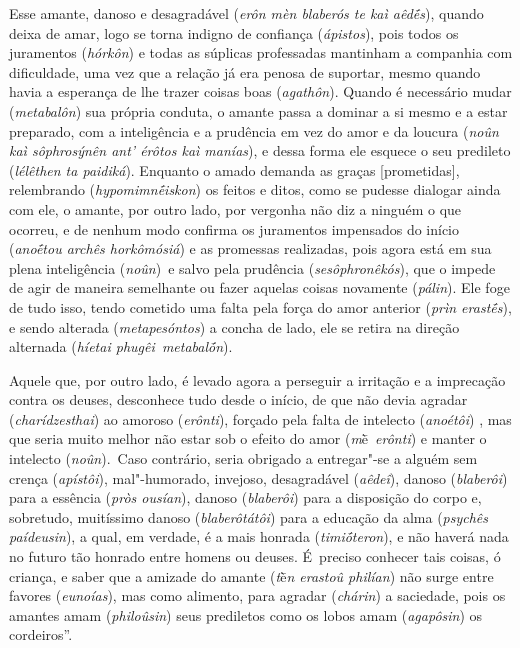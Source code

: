 Esse amante, danoso e desagradável (\emph{erôn mèn blaberós te kaì
aêdḗs}), quando deixa de amar, logo se torna indigno de confiança
(\emph{ápistos}), pois todos os juramentos (\emph{hórkôn}) e todas as
súplicas professadas mantinham a companhia com dificuldade, \bekker{[241a]}
uma vez que a relação já era penosa de suportar, mesmo quando havia a
esperança de lhe trazer coisas boas (\emph{agathôn}). Quando é
necessário mudar (\emph{metabalôn}) sua própria conduta, o amante passa
a dominar a si mesmo e a estar preparado, com a inteligência e a
prudência em vez do amor e da loucura (\emph{noûn kaì sôphrosýnên ant'
érôtos kaì manías}), e dessa forma ele esquece o seu predileto
(\emph{lélêthen ta paidiká}). Enquanto o amado demanda as graças
[prometidas], relembrando (\emph{hypomimnḗiskon}) os feitos e ditos,
como se pudesse dialogar ainda com ele, o amante, por outro lado, por
vergonha não diz a ninguém o que ocorreu, e de nenhum modo confirma os
juramentos impensados do início (\emph{anoḗtou archês horkômósiá}) e as
promessas realizadas, \bekker{[241b]} pois agora está em sua plena
inteligência (\emph{noûn})~e salvo pela prudência
(\emph{sesôphronêkós}), que o impede de agir de maneira semelhante ou
fazer aquelas coisas novamente (\emph{pálin}). Ele foge de tudo isso,
tendo cometido uma falta pela força do amor anterior (\emph{prìn
erastḗs}), e sendo alterada (\emph{metapesóntos}) a concha de lado, ele
se retira na direção alternada (\emph{híetai phugêi~metabalṓn}).

Aquele que, por outro lado, é levado agora a perseguir a irritação e a
imprecação contra os deuses, desconhece tudo desde o início, de que não
devia agradar (\emph{charídzesthai}) ao amoroso (\emph{erônti}), forçado
pela falta de intelecto (\emph{anoétôi}) \bekker{[241c]}, mas que seria muito
melhor não estar sob o efeito do amor (\emph{m}ḕ~\emph{erônti}) e manter
o intelecto (\emph{noûn}).~Caso contrário, seria obrigado a entregar"-se
a alguém sem crença (\emph{apístôi}), mal"-humorado, invejoso,
desagradável (\emph{aêdeî}), danoso (\emph{blaberôi}) para a essência
(\emph{pròs ousían}), danoso (\emph{blaberôi}) para a disposição do
corpo e, sobretudo, muitíssimo danoso (\emph{blaberôtátôi}) para a
educação da alma (\emph{psychês paídeusin}), a qual, em verdade, é a mais
honrada (\emph{timiṓteron}), e não haverá nada no futuro tão honrado
entre homens ou deuses. É~preciso conhecer tais coisas, ó criança, e
saber que a amizade do amante (\emph{t}ḕ\emph{n erastoû philían}) não
surge entre favores (\emph{eunoías}), mas como alimento, para agradar
(\emph{chárin}) a saciedade, \bekker{[241d]} pois os amantes amam
(\emph{philoûsin}) seus prediletos como os lobos amam (\emph{agapôsin})
os cordeiros''.

